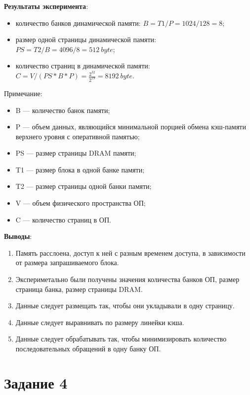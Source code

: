 
\textbf{Результаты эксперимента}:
\begin{itemize}
	\item количество банков динамической памяти: $B = T1/P = 1024/128 = 8$;
	\item размер одной страницы динамической памяти: $PS = T2/B = 4096/8 = 512\ byte$;
	\item количество страниц в динамической памяти: $C = V/(PS*B*P) = \frac{2^{32}}{2^{19}} = 8192\ byte$.
\end{itemize}

Примечание:
\begin{itemize}
	\item B --- количество банок памяти;
	\item P --- объем данных, являющийся минимальной порцией обмена кэш-памяти верхнего уровня с оперативной памятью;
	\item PS --- размер страницы DRAM памяти;
	\item T1 --- размер блока в одной банке памяти;
	\item T2 --- размер страницы одной банки памяти;
	\item V --- объем физического пространства ОП;
	\item C --- количество страниц в ОП.
\end{itemize}

\textbf{Выводы}:
\begin{enumerate}
	\item Память расслоена, доступ к ней с разным временем доступа, в зависимости от размера запрашиваемого блока.
	\item Экспериметально были получены значения количества банков ОП, размер страница банка, размер страницы DRAM.
	\item Данные следует размещать так, чтобы они укладывали в одну страницу.
	\item Данные следует выравнивать по размеру линейки кэша.
	\item Данные следует обрабатывать так, чтобы минимизировать количество последовательных обращений в одну банку ОП.
\end{enumerate} 

\section*{Задание 4}

